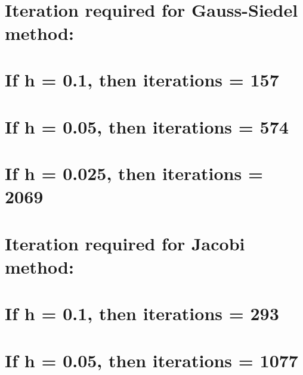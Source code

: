 \documentclass[11pt]{article}
\begin{document}
    \begin{center}
    \end{center}
    { \hspace*{\fill} \\}
    
    \hypertarget{iteration-required-for-gauss-siedel-method}{%
\section{Iteration required for Gauss-Siedel
method:}\label{iteration-required-for-gauss-siedel-method}}

\hypertarget{if-h-0.1-then-iterations-157}{%
\section{If h = 0.1, then iterations =
157}\label{if-h-0.1-then-iterations-157}}

\hypertarget{if-h-0.05-then-iterations-574}{%
\section{If h = 0.05, then iterations =
574}\label{if-h-0.05-then-iterations-574}}

\hypertarget{if-h-0.025-then-iterations-2069}{%
\section{If h = 0.025, then iterations =
2069}\label{if-h-0.025-then-iterations-2069}}

    \hypertarget{iteration-required-for-jacobi-method}{%
\section{Iteration required for Jacobi
method:}\label{iteration-required-for-jacobi-method}}

\hypertarget{if-h-0.1-then-iterations-293}{%
\section{If h = 0.1, then iterations =
293}\label{if-h-0.1-then-iterations-293}}

\hypertarget{if-h-0.05-then-iterations-1077}{%
\section{If h = 0.05, then iterations =
1077}\label{if-h-0.05-then-iterations-1077}}
\end{document}
